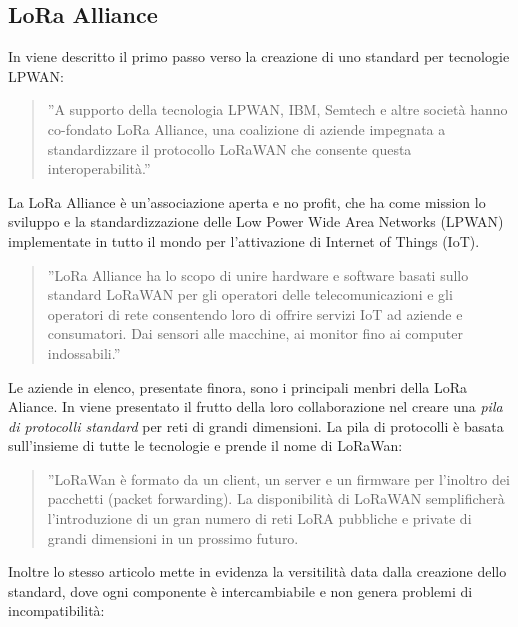 \documentclass[a4paper]{report} %
\begin{document}
\subsection{LoRa Alliance}
In \cite{art:rif.26} viene descritto il primo passo verso la creazione di uno standard per tecnologie LPWAN:
\begin{quote}
	''A supporto della tecnologia LPWAN, IBM, Semtech e altre società hanno co-fondato LoRa Alliance, una coalizione di aziende impegnata a standardizzare il protocollo LoRaWAN che consente questa interoperabilità.''
\end{quote}
La LoRa Alliance è un’associazione aperta e no profit, che ha come mission lo sviluppo e la standardizzazione delle Low Power Wide Area Networks (LPWAN) implementate in tutto il mondo per l’attivazione di Internet of Things (IoT).
\begin{quote}
	''LoRa Alliance ha lo scopo di unire hardware e software basati sullo standard LoRaWAN per gli operatori delle telecomunicazioni e gli operatori di rete consentendo loro di offrire servizi IoT ad aziende e consumatori. Dai sensori alle macchine, ai monitor fino ai computer indossabili.''
\end{quote}
Le aziende in elenco, presentate finora, sono i principali menbri della LoRa Aliance. In \cite{art:rif.23} viene presentato il frutto della loro collaborazione nel creare una \textit{pila di protocolli standard} per reti di grandi dimensioni. La pila di protocolli è basata sull'insieme di tutte le tecnologie e prende il nome di LoRaWan:
\begin{quote}
	''LoRaWan è formato da un client, un server e un firmware per l'inoltro dei pacchetti (packet forwarding). La disponibilità di LoRaWAN semplificherà l'introduzione di un gran numero di reti LoRA pubbliche e private di grandi dimensioni in un prossimo futuro. 
\end{quote}
Inoltre lo stesso articolo mette in evidenza la versitilità data dalla creazione dello standard, dove ogni componente è intercambiabile e non genera problemi di incompatibilità:
\end{document}
